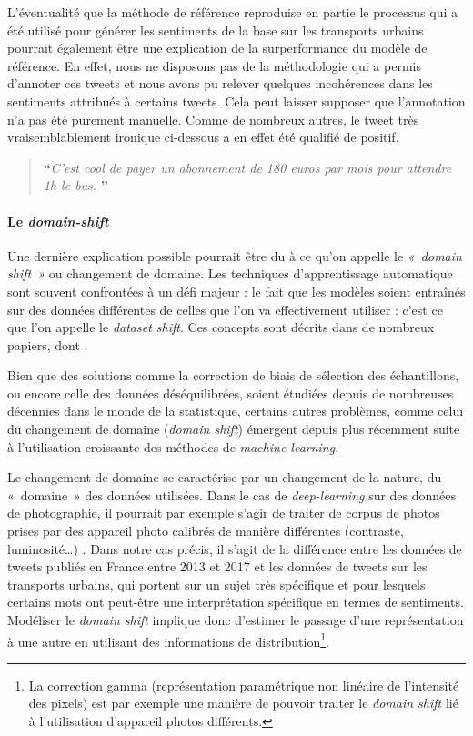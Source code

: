 \documentclass[11pt,french,french]{article}
\let\rmarkdownfootnote\footnote%
\def\footnote{\protect\rmarkdownfootnote}
\begin{document}
L'éventualité que la méthode de référence reproduise en partie le
processus qui a été utilisé pour générer les sentiments de la base sur
les transports urbains pourrait également être une explication de la
surperformance du modèle de référence. En effet, nous ne disposons pas
de la méthodologie qui a permis d'annoter ces tweets et nous avons pu
relever quelques incohérences dans les sentiments attribués à certains
tweets. Cela peut laisser supposer que l'annotation n'a pas été purement
manuelle. Comme de nombreux autres, le tweet très vraisemblablement
ironique ci-dessous a en effet été qualifié de positif.

\begin{quote}
\LARGE \textbf{``}\normalsize \emph{C'est cool de payer un abonnement de 180 euros par mois pour attendre 1h le bus.} \LARGE \textbf{''}\normalsize
\end{quote}

\paragraph{\texorpdfstring{Le
\emph{domain-shift}}{Le domain-shift}}\label{le-domain-shift}

Une dernière explication possible pourrait être du à ce qu'on appelle le
\emph{« domain shift »} ou changement de domaine. Les techniques
d'apprentissage automatique sont souvent confrontées à un défi majeur :
le fait que les modèles soient entraînés sur des données différentes de
celles que l'on va effectivement utiliser : c'est ce que l'on appelle le
\emph{dataset shift}. Ces concepts sont décrits dans de nombreux
papiers, dont \cite{Candela}.

Bien que des solutions comme la correction de biais de sélection des
échantillons, ou encore celle des données déséquilibrées, soient
étudiées depuis de nombreuses décennies dans le monde de la statistique,
certains autres problèmes, comme celui du changement de domaine
(\emph{domain shift}) émergent depuis plus récemment suite à
l'utilisation croissante des méthodes de \emph{machine learning}.

Le changement de domaine se caractérise par un changement de la nature,
du «~domaine~» des données utilisées. Dans le cas de
\emph{deep-learning} sur des données de photographie, il pourrait par
exemple s'agir de traiter de corpus de photos prises par des appareil
photo calibrés de manière différentes (contraste, luminosité\dots) .
Dans notre cas précis, il s'agit de la différence entre les données de
tweets publiés en France entre 2013 et 2017 et les données de tweets sur
les transports urbains, qui portent sur un sujet très spécifique et pour
lesquels certains mots ont peut-être une interprétation spécifique en
termes de sentiments. Modéliser le \emph{domain shift} implique donc
d'estimer le passage d'une représentation à une autre en utilisant des
informations de distribution\footnote{La correction gamma
  (représentation paramétrique non linéaire de l'intensité des pixels)
  est par exemple une manière de pouvoir traiter le \emph{domain shift}
  lié à l'utilisation d'appareil photos différents.}.
\end{document}
